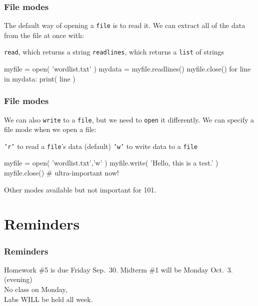 \documentclass[11pt]{beamer}
\begin{document}
\begin{frame}[fragile]
  \frametitle{File modes}
  \Enlarge

  \begin{itemize}
  \myitem  The default way of opening a \texttt{file} is to read it.
  \myitem  We can extract all of the data from the file at once with:
    \begin{itemize}
    \mysubitem  \texttt{read}, which returns a string
    \mysubitem  \texttt{readlines}, which returns a \texttt{list} of strings
    \end{itemize}
  \end{itemize}
  \begin{semiverbatim}
myfile = open( 'wordlist.txt' )
mydata = myfile.readlines()
myfile.close()
for line in mydata:
    print( line )
  \end{semiverbatim}
\end{frame}

\begin{frame}[fragile]
  \frametitle{File modes}
  \Enlarge

  \begin{itemize}
  \myitem  We can also \texttt{write} to a \texttt{file}, but we need to \texttt{open} it differently.
  \myitem  We can specify a file mode when we open a file:
    \begin{itemize}
    \mysubitem  \texttt{'r'} to read a \texttt{file}'s data (default)
    \mysubitem  \texttt{'w'} to write data to a \texttt{file}
    \end{itemize}
  \end{itemize}
  \begin{semiverbatim}
myfile = open( 'wordlist.txt','w' )
myfile.write( 'Hello, this is a test.' )
myfile.close()  # ultra-important now!
  \end{semiverbatim}
  \begin{itemize}
  \myitem  Other modes available but not important for 101.
  \end{itemize}
\end{frame}


\section{Reminders}

\begin{frame}
  \frametitle{Reminders}
  \Enlarge

  \begin{itemize}
  \myitem  Homework \#5 is due Friday Sep.\ 30.
  \myitem  Midterm \#1 will be Monday Oct.\ 3.  (evening) \\ \textcolor{CS101GradBot}{No class on Monday, \\ Labs WILL be held all week.}
  \end{itemize}
\end{frame}
\end{document}
